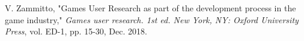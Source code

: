 \documentclass[journal]{IEEEtran}
\begin{document}
\begin{thebibliography}{17}
V. Zammitto, "Games User Research as part of the development process in the game industry," \emph{Games user research. 1st ed. New York, NY: Oxford University Press}, vol. ED-1, pp. 15-30, Dec. 2018.


\end{thebibliography}

% 










\end{document}

